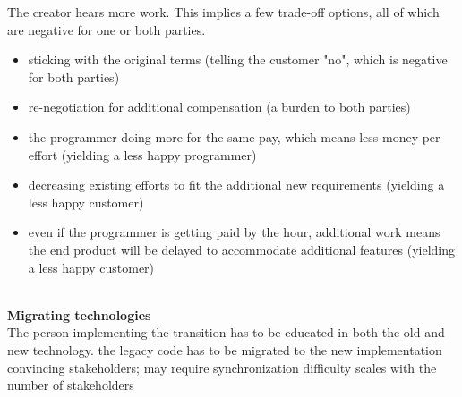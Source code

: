 The creator hears more work. This implies a few trade-off options, all of which are negative for one or both parties.
\begin{itemize}
    \item sticking with the original terms (telling the customer "no", which is negative for both parties)
    \item re-negotiation for additional compensation (a burden to both parties)
    \item the programmer doing more for the same pay, which means less money per effort (yielding a less happy programmer)
    \item decreasing existing efforts to fit the additional new requirements (yielding a less happy customer)
    \item even if the programmer is getting paid by the hour, additional work means the end product will be delayed to accommodate additional features (yielding a less happy customer)
\end{itemize}

\ \\

\textbf{Migrating technologies} \\
The person implementing the transition has to be educated in both the old and new technology. 
the legacy code has to be migrated to the new implementation
convincing stakeholders; may require synchronization
difficulty scales with the number of stakeholders 